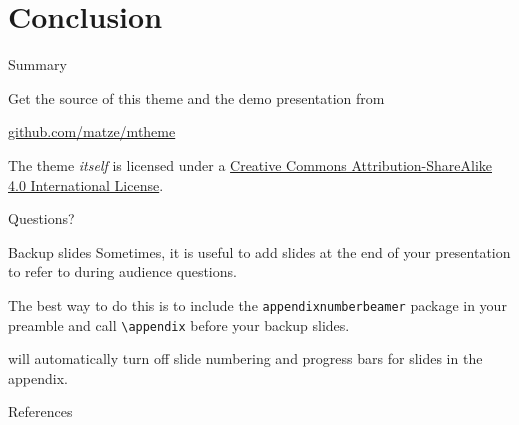 \section{Conclusion}

\begin{frame}{Summary}

  Get the source of this theme and the demo presentation from

  \begin{center}\url{github.com/matze/mtheme}\end{center}

  The theme \emph{itself} is licensed under a
  \href{http://creativecommons.org/licenses/by-sa/4.0/}{Creative Commons
  Attribution-ShareAlike 4.0 International License}.

  \begin{center}\ccbysa\end{center}

\end{frame}

\begin{frame}[standout]
  Questions?
\end{frame}

\appendix

\begin{frame}[fragile]{Backup slides}
  Sometimes, it is useful to add slides at the end of your presentation to
  refer to during audience questions.

  The best way to do this is to include the \verb|appendixnumberbeamer|
  package in your preamble and call \verb|\appendix| before your backup slides.

  \themename will automatically turn off slide numbering and progress bars for
  slides in the appendix.
\end{frame}

\begin{frame}[allowframebreaks]{References}

  
  \printbibliography

\end{frame}


